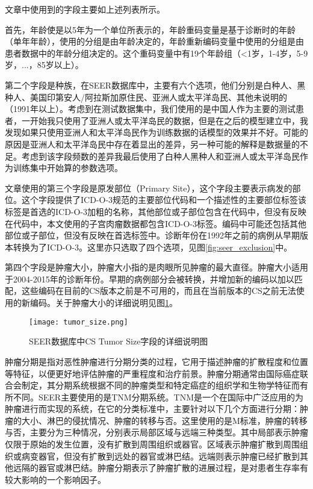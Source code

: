 文章中使用到的字段主要如上述列表所示。

首先，年龄使是以5年为一个单位所表示的，年龄重码变量是基于诊断时的年龄（单年年龄），使用的分组是由年龄决定的，年龄重新编码变量中使用的分组是由患者数据中的年龄分组决定的。这个重码变量中有19个年龄组（\textless1岁，1-4岁，5-9岁，...，85岁以上）。

第二个字段是种族，在SEER数据库中，主要有六个选项，他们分别是白种人、黑种人、美国印第安人/阿拉斯加原住民、亚洲人或太平洋岛民、其他未说明的（1991年以上）。考虑到在测试数据集中，我们使用的是中国人作为主要的测试患者，一开始我只使用了亚洲人或太平洋岛民的数据，但是在之后的模型建立中，我发现如果只使用亚洲人和太平洋岛民作为训练数据的话模型的效果并不好。可能的原因是亚洲人和太平洋岛民中存在着显出的差异，另一种可能的解释是数据量的不足。考虑到该字段频数的差异我最后使用了白种人黑种人和亚洲人或太平洋岛民作为训练集中开始算的参数选项。

文章使用的第三个字段是原发部位（Primary Site），这个字段主要表示病发的部位。这个字段提供了ICD-O-3规范的主要部位代码和一个描述性的主要部位标签该标签是首选的ICD-O-3加粗的名称，其他部位或子部位包含在代码中，但没有反映在代码中，本文使用的子宫肉瘤数据都包含ICD-O-3标签。编码中可能还包括其他部位或子部位，但没有反映在首选标签中。诊断年份在1992年之前的病例从早期版本转换为了ICD-O-3。这里亦只选取了四个选项，见图\ref{fig:seer_exclusion}中。

第四个字段是肿瘤大小，肿瘤大小指的是肉眼所见肿瘤的最大直径。肿瘤大小适用于2004-2015年的诊断年份。早期的病例部分会被转换，并增加新的编码以加以匹配，这些编码在目前的CS版本之前是不可用的，而且在当前版本的CS之前无法使用的新编码。关于肿瘤大小的详细说明见图\ref{fig:tumor_size}。

\begin{figure}[!htbp]
    \centering
    \texttt{[image: tumor\_size.png]}
    \caption{SEER数据库中CS Tumor Size字段的详细说明图} \label{fig:tumor_size}
\end{figure}

肿瘤分期是指对恶性肿瘤进行分期分类的过程，它用于描述肿瘤的扩散程度和位置等特征，以便更好地评估肿瘤的严重程度和治疗前景。肿瘤分期通常由国际癌症联合会制定，其分期系统根据不同的肿瘤类型和特定癌症的组织学和生物学特征而有所不同。SEER主要使用的是TNM分期系统。TNM是一个在国际中广泛应用的为肿瘤进行而实现的系统，在它的分类标准中，主要针对以下几个方面进行分期：肿瘤的大小、淋巴的侵扰情况、肿瘤的转移与否。这里使用的是M标准，肿瘤的转移与否，主要分为三种情况，分别表示局部区域与远端三种类型。其中局部表示肿瘤仅限于原始的发生位置，没有扩散到周围组织或器官。区域表示肿瘤扩散到周围组织或病变器官，但没有扩散到远处的器官或淋巴结。远端则表示肿瘤已经扩散到其他远隔的器官或淋巴结。肿瘤分期表示了肿瘤扩散的进展过程，是对患者生存率有较大影响的一个影响因子。

